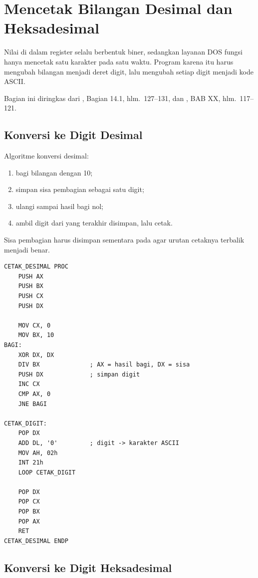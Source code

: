 \section{Mencetak Bilangan Desimal dan Heksadesimal}
\label{sec:cetak-bilangan}

Nilai di dalam register selalu berbentuk biner, sedangkan layanan DOS
fungsi  hanya mencetak satu karakter pada satu waktu. Program
karena itu harus mengubah bilangan menjadi deret digit, lalu mengubah
setiap digit menjadi kode ASCII.

Bagian ini diringkas dari \cite{gunawan2019}, Bagian 14.1,
hlm.~127--131, dan \cite{sto2001}, BAB XX, hlm.~117--121.

\subsection{Konversi ke Digit Desimal}

Algoritme konversi desimal:

\begin{enumerate}
    \item bagi bilangan dengan 10;
    \item simpan sisa pembagian sebagai satu digit;
    \item ulangi sampai hasil bagi nol;
    \item ambil digit dari yang terakhir disimpan, lalu cetak.
\end{enumerate}

Sisa pembagian harus disimpan sementara pada  agar urutan
cetaknya terbalik menjadi benar.

\begin{lstlisting}[language=MASM, numbers=none]
CETAK_DESIMAL PROC
    PUSH AX
    PUSH BX
    PUSH CX
    PUSH DX

    MOV CX, 0
    MOV BX, 10
BAGI:
    XOR DX, DX
    DIV BX              ; AX = hasil bagi, DX = sisa
    PUSH DX             ; simpan digit
    INC CX
    CMP AX, 0
    JNE BAGI

CETAK_DIGIT:
    POP DX
    ADD DL, '0'         ; digit -> karakter ASCII
    MOV AH, 02h
    INT 21h
    LOOP CETAK_DIGIT

    POP DX
    POP CX
    POP BX
    POP AX
    RET
CETAK_DESIMAL ENDP
\end{lstlisting}

\subsection{Konversi ke Digit Heksadesimal}

